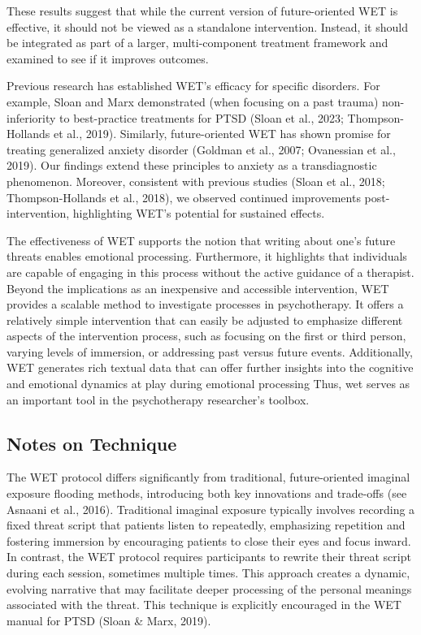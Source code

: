 \documentclass[
  man,floatsintext]{apa7}
\begin{document}
These results suggest that while the current version of future-oriented WET is effective, it should not be viewed as a standalone intervention.
Instead, it should be integrated as part of a larger, multi-component treatment framework and examined to see if it improves outcomes.

Previous research has established WET's efficacy for specific disorders.
For example, Sloan and Marx demonstrated (when focusing on a past trauma) non-inferiority to best-practice treatments for PTSD (Sloan et al., 2023; Thompson-Hollands et al., 2019).
Similarly, future-oriented WET has shown promise for treating generalized anxiety disorder (Goldman et al., 2007; Ovanessian et al., 2019).
Our findings extend these principles to anxiety as a transdiagnostic phenomenon.
Moreover, consistent with previous studies (Sloan et al., 2018; Thompson-Hollands et al., 2018), we observed continued improvements post-intervention, highlighting WET's potential for sustained effects.

The effectiveness of WET supports the notion that writing about one's future threats enables emotional processing.
Furthermore, it highlights that individuals are capable of engaging in this process without the active guidance of a therapist.
Beyond the implications as an inexpensive and accessible intervention, WET provides a scalable method to investigate processes in psychotherapy.
It offers a relatively simple intervention that can easily be adjusted to emphasize different aspects of the intervention process, such as focusing on the first or third person, varying levels of immersion, or addressing past versus future events.
Additionally, WET generates rich textual data that can offer further insights into the cognitive and emotional dynamics at play during emotional processing
Thus, wet serves as an important tool in the psychotherapy researcher's toolbox.

\subsection{Notes on Technique}\label{notes-on-technique}

The WET protocol differs significantly from traditional, future-oriented imaginal exposure flooding methods, introducing both key innovations and trade-offs (see Asnaani et al., 2016).
Traditional imaginal exposure typically involves recording a fixed threat script that patients listen to repeatedly, emphasizing repetition and fostering immersion by encouraging patients to close their eyes and focus inward.
In contrast, the WET protocol requires participants to rewrite their threat script during each session, sometimes multiple times.
This approach creates a dynamic, evolving narrative that may facilitate deeper processing of the personal meanings associated with the threat.
This technique is explicitly encouraged in the WET manual for PTSD (Sloan \& Marx, 2019).
\end{document}
